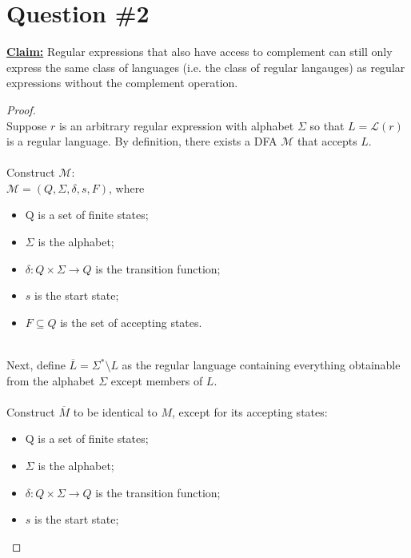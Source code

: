 \documentclass[12pt]{article}
\begin{document}
\section*{Question \#2}
\textbf{\underline{Claim:}} Regular expressions that also have access to complement can still only express the same class of languages (i.e. the class of regular langauges) as regular expressions without the complement operation.
\begin{proof}
\leavevmode\\
    Suppose $r$ is an arbitrary regular expression with alphabet $\Sigma$ so that $L = \mathcal{L}(r)$ is a regular language. By definition, there exists a DFA $\mathcal{M}$ that accepts $L$. \\
    \\
    Construct $\mathcal{M}$: \\
    \(\mathcal{M} = (Q, \Sigma, \delta, s, F)\), where
    \begin{itemize}
        \item Q is a set of finite states;
        \item $\Sigma$ is the alphabet;
        \item $\delta : Q \times \Sigma \to Q$ is the transition function;
        \item $s$ is the start state;
        \item $F \subseteq Q$ is the set of accepting states.
    \end{itemize}
    \leavevmode\\
    Next, define $\overline{L} = \Sigma^* \setminus L$ as the regular language containing everything obtainable from the alphabet $\Sigma$ except members of $L$. \\
    \\
    Construct $\overline{M}$ to be identical to $M$, except for its accepting states:
    \begin{itemize}
        \item Q is a set of finite states;
        \item $\Sigma$ is the alphabet;
        \item $\delta : Q \times \Sigma \to Q$ is the transition function;
        \item $s$ is the start state;

\end{itemize}
\end{proof}
\end{document}
